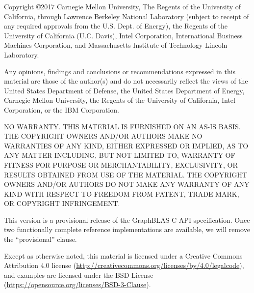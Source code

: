 \documentclass[11pt]{extbook}
\renewcommand{\thefootnote}{\fnsymbol{footnote}}
\begin{document}
\setlength{\parskip}{0.5\baselineskip}
\setlength{\parindent}{0ex}

\maketitle


\renewcommand{\thefootnote}{\arabic{footnote}}
\setcounter{footnote}{0}

\vfill

Copyright \copyright 2017 Carnegie Mellon University, The Regents 
of the University of California, through Lawrence Berkeley National 
Laboratory (subject to receipt of any required approvals from the 
U.S. Dept. of Energy), the Regents of the University of California 
(U.C. Davis), Intel Corporation, International Business Machines 
Corporation, and Massachusetts Institute of Technology Lincoln
Laboratory. 

Any opinions, findings and conclusions or recommendations expressed in 
this material are those of the author(s) and do not necessarily reflect 
the views of the United States Department of Defense, the United States 
Department of Energy, Carnegie Mellon University, the Regents of the 
University of California, Intel Corporation, or the IBM Corporation.  

NO WARRANTY. THIS MATERIAL IS FURNISHED ON AN AS-IS BASIS. THE COPYRIGHT 
OWNERS AND/OR AUTHORS MAKE NO WARRANTIES OF ANY KIND, EITHER EXPRESSED 
OR IMPLIED, AS TO ANY MATTER INCLUDING, BUT NOT LIMITED TO, WARRANTY OF 
FITNESS FOR PURPOSE OR MERCHANTABILITY, EXCLUSIVITY, OR RESULTS OBTAINED 
FROM USE OF THE MATERIAL. THE COPYRIGHT OWNERS AND/OR AUTHORS DO NOT MAKE 
ANY WARRANTY OF ANY KIND WITH RESPECT TO FREEDOM FROM PATENT, TRADE MARK, 
OR COPYRIGHT INFRINGEMENT.

\vspace{1.5cm}
{\Large This version is a provisional release of the GraphBLAS C API specification. Once two functionally
complete reference implementations are available, we will remove the ``provisional'' clause. }
\vspace{1.5cm}



Except as otherwise noted, this material is licensed under a Creative Commons Attribution 4.0 license (\href{http://creativecommons.org/licenses/by/4.0/legalcode}{http://creativecommons.org/licenses/by/4.0/legalcode}), 
and examples are licensed under the BSD License (\href{https://opensource.org/licenses/BSD-3-Clause}{https://opensource.org/licenses/BSD-3-Clause}).
\end{document}
